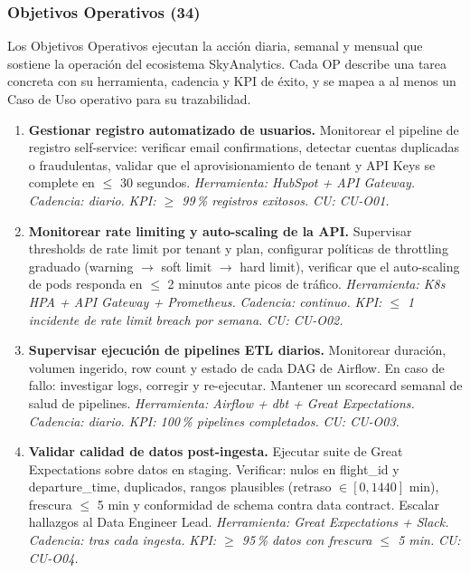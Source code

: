 ﻿\documentclass[11pt, letterpaper]{article}
\begin{document}
\subsubsection{Objetivos Operativos (34)}



Los Objetivos Operativos ejecutan la acción diaria, semanal y mensual que sostiene la operación del ecosistema SkyAnalytics. Cada OP describe una tarea concreta con su herramienta, cadencia y KPI de éxito, y se mapea a al menos un Caso de Uso operativo para su trazabilidad.



\begin{enumerate}[leftmargin=1.5cm, label=\textbf{OP\arabic*}, itemsep=2pt, topsep=4pt]

    \item \textbf{Gestionar registro automatizado de usuarios.} Monitorear el pipeline de registro self-service: verificar email confirmations, detectar cuentas duplicadas o fraudulentas, validar que el aprovisionamiento de tenant y API Keys se complete en $\leq$ 30 segundos. \textit{Herramienta: HubSpot + API Gateway.} \textit{Cadencia: diario.} \textit{KPI: $\geq$ 99\,\% registros exitosos.} \textit{CU: CU-O01.}



    \item \textbf{Monitorear rate limiting y auto-scaling de la API.} Supervisar thresholds de rate limit por tenant y plan, configurar políticas de throttling graduado (warning $\rightarrow$ soft limit $\rightarrow$ hard limit), verificar que el auto-scaling de pods responda en $\leq$ 2 minutos ante picos de tráfico. \textit{Herramienta: K8s HPA + API Gateway + Prometheus.} \textit{Cadencia: continuo.} \textit{KPI: $\leq$ 1 incidente de rate limit breach por semana.} \textit{CU: CU-O02.}



    \item \textbf{Supervisar ejecución de pipelines ETL diarios.} Monitorear duración, volumen ingerido, row count y estado de cada DAG de Airflow. En caso de fallo: investigar logs, corregir y re-ejecutar. Mantener un scorecard semanal de salud de pipelines. \textit{Herramienta: Airflow + dbt + Great Expectations.} \textit{Cadencia: diario.} \textit{KPI: 100\,\% pipelines completados.} \textit{CU: CU-O03.}



    \item \textbf{Validar calidad de datos post-ingesta.} Ejecutar suite de Great Expectations sobre datos en staging. Verificar: nulos en flight\_id y departure\_time, duplicados, rangos plausibles (retraso $\in [0, 1440]$ min), frescura $\leq$ 5 min y conformidad de schema contra data contract. Escalar hallazgos al Data Engineer Lead. \textit{Herramienta: Great Expectations + Slack.} \textit{Cadencia: tras cada ingesta.} \textit{KPI: $\geq$ 95\,\% datos con frescura $\leq$ 5 min.} \textit{CU: CU-O04.}




\end{enumerate}
\end{document}
